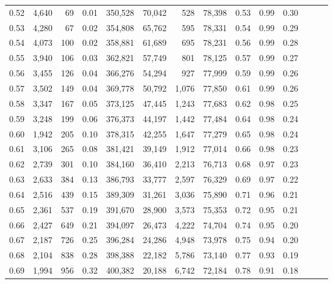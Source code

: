 \begin{tabular}{rrrrrrrrrrrrrr}
0.52 &   4,640 &     69 &  0.01 &  350,528 &   70,042 &     528 &  78,398 &  0.53 &  0.99 &      0.30 \\
0.53 &   4,280 &     67 &  0.02 &  354,808 &   65,762 &     595 &  78,331 &  0.54 &  0.99 &      0.29 \\
0.54 &   4,073 &    100 &  0.02 &  358,881 &   61,689 &     695 &  78,231 &  0.56 &  0.99 &      0.28 \\
0.55 &   3,940 &    106 &  0.03 &  362,821 &   57,749 &     801 &  78,125 &  0.57 &  0.99 &      0.27 \\
0.56 &   3,455 &    126 &  0.04 &  366,276 &   54,294 &     927 &  77,999 &  0.59 &  0.99 &      0.26 \\
0.57 &   3,502 &    149 &  0.04 &  369,778 &   50,792 &   1,076 &  77,850 &  0.61 &  0.99 &      0.26 \\
0.58 &   3,347 &    167 &  0.05 &  373,125 &   47,445 &   1,243 &  77,683 &  0.62 &  0.98 &      0.25 \\
0.59 &   3,248 &    199 &  0.06 &  376,373 &   44,197 &   1,442 &  77,484 &  0.64 &  0.98 &      0.24 \\
0.60 &   1,942 &    205 &  0.10 &  378,315 &   42,255 &   1,647 &  77,279 &  0.65 &  0.98 &      0.24 \\
0.61 &   3,106 &    265 &  0.08 &  381,421 &   39,149 &   1,912 &  77,014 &  0.66 &  0.98 &      0.23 \\
0.62 &   2,739 &    301 &  0.10 &  384,160 &   36,410 &   2,213 &  76,713 &  0.68 &  0.97 &      0.23 \\
0.63 &   2,633 &    384 &  0.13 &  386,793 &   33,777 &   2,597 &  76,329 &  0.69 &  0.97 &      0.22 \\
0.64 &   2,516 &    439 &  0.15 &  389,309 &   31,261 &   3,036 &  75,890 &  0.71 &  0.96 &      0.21 \\
0.65 &   2,361 &    537 &  0.19 &  391,670 &   28,900 &   3,573 &  75,353 &  0.72 &  0.95 &      0.21 \\
0.66 &   2,427 &    649 &  0.21 &  394,097 &   26,473 &   4,222 &  74,704 &  0.74 &  0.95 &      0.20 \\
0.67 &   2,187 &    726 &  0.25 &  396,284 &   24,286 &   4,948 &  73,978 &  0.75 &  0.94 &      0.20 \\
0.68 &   2,104 &    838 &  0.28 &  398,388 &   22,182 &   5,786 &  73,140 &  0.77 &  0.93 &      0.19 \\
0.69 &   1,994 &    956 &  0.32 &  400,382 &   20,188 &   6,742 &  72,184 &  0.78 &  0.91 &      0.18 \\

\end{tabular}
